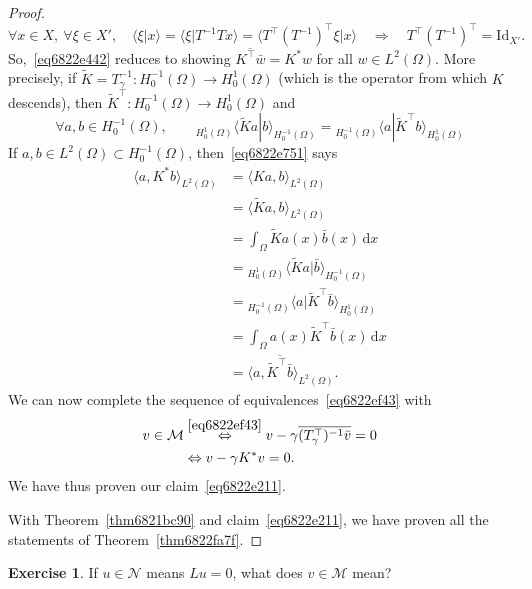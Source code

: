 \documentclass[a4paper,9pt]{amsart}
\newcommand{\scr}[1]{\mathscr{#1}}
\newcommand{\cal}[1]{\mathcal{#1}}
\newcommand{\Id}{\mathrm{Id}}	%
\newcommand{\did}{\,\mathrm{d}}	%
\newcommand{\THEN}{\Rightarrow}	%
\newcommand{\IFF}{\Leftrightarrow}	%
\theoremstyle{plain}
\theoremstyle{definition}
\newtheorem{exercise}[proposition]{Exercise}%
\theoremstyle{remark}
\begin{document}
\begin{proof}
\begin{equation}
		\forall x\in X,\ \forall\xi\in X',\quad
		\langle \xi|x \rangle 
		= \langle \xi | T^{-1}Tx \rangle
		= \langle T^\top (T^{-1})^\top\xi|x \rangle 
		\quad\THEN\quad 
		T^\top (T^{-1})^\top = \Id_{X'} .
	\end{equation}
	So,~\eqref{eq6822e442} reduces to showing $\overline{ K^\top \bar w } = K^*w$ for all $w\in L^2(\Omega)$.
	More precisely, if $\tilde K=T_\gamma^{-1}:H^{-1}_0(\Omega)\to H^1_0(\Omega)$ (which is the operator from which $K$ descends),
	then $\tilde K^\top:H^{-1}_0(\Omega)\to H^1_0(\Omega)$ and
	\begin{equation}\label{eq6822e751}
		\forall a,b\in H^{-1}_0(\Omega),\qquad
		{}_{H^{1}_0(\Omega)}\langle \tilde Ka | b \rangle_{H^{-1}_0(\Omega)}
		= {}_{H^{-1}_0(\Omega)}\langle a | \tilde K^\top b \rangle_{H^{1}_0(\Omega)}
	\end{equation}
	If $a,b\in L^2(\Omega)\subset H^{-1}_0(\Omega)$, then~\eqref{eq6822e751} says
	\begin{align}
		\langle a, K^* b \rangle_{L^2(\Omega)} 
		&= \langle K a, b \rangle_{L^2(\Omega)} \\
		&= \langle \tilde K a , b  \rangle_{L^2(\Omega)} \\
		&= \int_\Omega \tilde K a(x) \bar b(x) \did x \\
		&= {}_{H^{1}_0(\Omega)}\langle \tilde Ka | \bar b \rangle_{H^{-1}_0(\Omega)} \\
		&= {}_{H^{-1}_0(\Omega)}\langle a | \tilde K^\top \bar b \rangle_{H^{1}_0(\Omega)} \\
		&= \int_\Omega  a(x) \tilde K^\top\bar b(x) \did x \\
		&= \langle  a , \overline{\tilde K^\top \bar b}  \rangle_{L^2(\Omega)} .
	\end{align}
	We can now complete the sequence of equivalences~\eqref{eq6822ef43} with
	\begin{align}
		v \in \cal M
		&\overset{\eqref{eq6822ef43}}\IFF v - \gamma \overline{ (T_\gamma^\top)^{-1} \bar v} = 0 \\
		&\IFF v- \gamma K^*v = 0 .
	\end{align}
	We have thus proven our claim~\eqref{eq6822e211}.
	
	With Theorem~\ref{thm6821bc90} and claim~\eqref{eq6822e211},
	we have proven all the statements of Theorem~\ref{thm6822fa7f}.
\end{proof}

\begin{exercise}
	If $u\in\scr N$ means $Lu=0$, what does $v\in\scr M$ mean?
\end{exercise}
\end{document}
